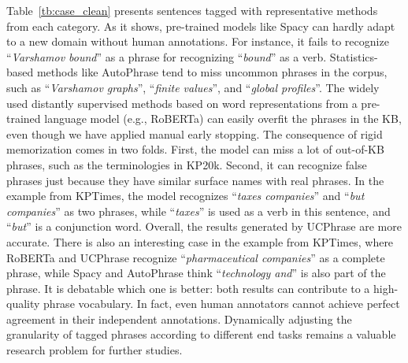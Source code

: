 \documentclass[sigconf]{acmart}
\newcommand{\our}{\mbox{UCPhrase}\xspace}
\newcommand{\eg}{\mbox{e.g.}\xspace}
\newcommand{\example}[1]{``\emph{#1}''}
\begin{document}
Table~\ref{tb:case_clean} presents sentences tagged with representative methods from each category.
As it shows, pre-trained 
models like Spacy can hardly adapt to a new domain without human annotations.
For instance, it fails to recognize \example{Varshamov bound} as a phrase for recognizing \example{bound} as a verb.
Statistics-based methods like AutoPhrase tend to miss uncommon phrases in the corpus, such as \example{Varshamov graphs}, \example{finite values}, and \example{global profiles}.
The widely used distantly supervised methods based on word representations from a pre-trained language model (\eg, RoBERTa) can easily overfit the phrases in the KB, even though we have applied manual early stopping.
The consequence of rigid memorization comes in two folds.
First, the model can miss a lot of out-of-KB phrases, such as the terminologies in KP20k.
Second, it can recognize false phrases just because they have similar surface names with real phrases.
In the example from KPTimes, the model recognizes \example{taxes companies} and \example{but companies} as two phrases, while \example{taxes} is used as a verb in this sentence, and \example{but} is a conjunction word.
Overall, the results generated by \our are more accurate. 
There is also an interesting case in the example from KPTimes, where RoBERTa and \our recognize \example{pharmaceutical companies} as a complete phrase, while Spacy and AutoPhrase think \example{technology and} is also part of the phrase.
It is debatable which one is better: both results can contribute to a high-quality phrase vocabulary.
In fact, even human annotators cannot achieve perfect agreement in their independent annotations.
Dynamically adjusting the granularity of tagged phrases according to different end tasks remains a valuable research problem for further studies.


\newcommand{\typo}[1]{\emph{#1}} \newcommand{\prob}[1]{\textcolor{gblue}{ }} 
\end{document}
